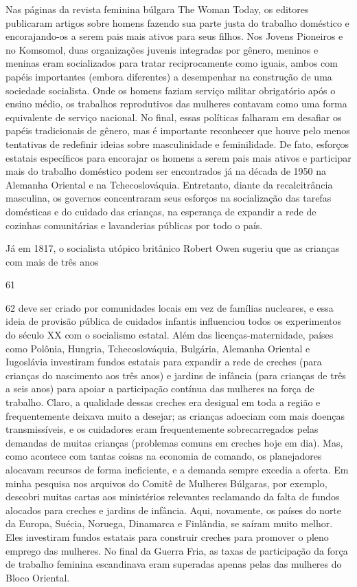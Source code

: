 Nas páginas da revista feminina búlgara The Woman Today, os editores publicaram artigos sobre homens fazendo sua parte justa do trabalho doméstico e encorajando-os a serem pais mais ativos para seus filhos. Nos Jovens Pioneiros e no Komsomol, duas organizações juvenis integradas por gênero, meninos e meninas eram socializados para tratar reciprocamente como iguais, ambos com papéis importantes (embora diferentes) a desempenhar na construção de uma sociedade socialista. Onde os homens faziam serviço militar obrigatório após o ensino médio, os trabalhos reprodutivos das mulheres contavam como uma forma equivalente de serviço nacional. No final, essas políticas falharam em desafiar os papéis tradicionais de gênero, mas é importante reconhecer que houve pelo menos tentativas de redefinir ideias sobre masculinidade e feminilidade. De fato, esforços estatais específicos para encorajar os homens a serem pais mais ativos e participar mais do trabalho doméstico podem ser encontrados já na década de 1950 na Alemanha Oriental e na Tchecoslováquia. Entretanto, diante da recalcitrância masculina, os governos concentraram seus esforços na socialização das tarefas domésticas e do cuidado das crianças, na esperança de expandir a rede de cozinhas comunitárias e lavanderias públicas por todo o país.
 \par 
Já em 1817, o socialista utópico britânico Robert Owen sugeriu que as crianças com mais de três anos
 \par 
61
 \par 
62 deve ser criado por comunidades locais em vez de famílias nucleares, e essa ideia de provisão pública de cuidados infantis influenciou todos os experimentos do século XX com o socialismo estatal. Além das licenças-maternidade, países como Polônia, Hungria, Tchecoslováquia, Bulgária, Alemanha Oriental e Iugoslávia investiram fundos estatais para expandir a rede de creches (para crianças do nascimento aos três anos) e jardins de infância (para crianças de três a seis anos) para apoiar a participação contínua das mulheres na força de trabalho. Claro, a qualidade dessas creches era desigual em toda a região e frequentemente deixava muito a desejar; as crianças adoeciam com mais doenças transmissíveis, e os cuidadores eram frequentemente sobrecarregados pelas demandas de muitas crianças (problemas comuns em creches hoje em dia). Mas, como acontece com tantas coisas na economia de comando, os planejadores alocavam recursos de forma ineficiente, e a demanda sempre excedia a oferta. Em minha pesquisa nos arquivos do Comitê de Mulheres Búlgaras, por exemplo, descobri muitas cartas aos ministérios relevantes reclamando da falta de fundos alocados para creches e jardins de infância. Aqui, novamente, os países do norte da Europa, Suécia, Noruega, Dinamarca e Finlândia, se saíram muito melhor. Eles investiram fundos estatais para construir creches para promover o pleno emprego das mulheres. No final da Guerra Fria, as taxas de participação da força de trabalho feminina escandinava eram superadas apenas pelas das mulheres do Bloco Oriental.
